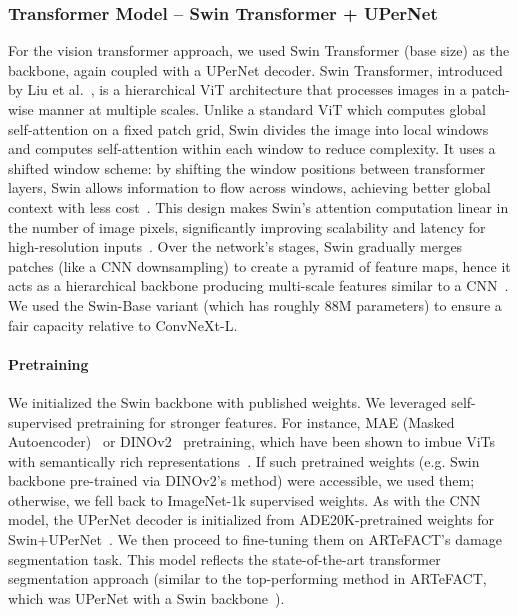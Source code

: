 \documentclass[conference]{IEEEtran}
\begin{document}
\subsubsection{Transformer Model – Swin Transformer + UPerNet}
For the vision transformer approach, we used Swin Transformer (base size) as the backbone, again coupled with a UPerNet decoder. Swin Transformer, introduced by Liu et al.~\cite{liu_swin_2021}, is a hierarchical ViT architecture that processes images in a patch-wise manner at multiple scales. Unlike a standard ViT which computes global self-attention on a fixed patch grid, Swin divides the image into local windows and computes self-attention within each window to reduce complexity. It uses a shifted window scheme: by shifting the window positions between transformer layers, Swin allows information to flow across windows, achieving better global context with less cost~\cite{liu_swin_2021}. This design makes Swin’s attention computation linear in the number of image pixels, significantly improving scalability and latency for high-resolution inputs~\cite{liu_swin_2021}. Over the network’s stages, Swin gradually merges patches (like a CNN downsampling) to create a pyramid of feature maps, hence it acts as a hierarchical backbone producing multi-scale features similar to a CNN~\cite{liu_swin_2021}. We used the Swin-Base variant (which has roughly 88M parameters) to ensure a fair capacity relative to ConvNeXt-L.
\paragraph{Pretraining}
We initialized the Swin backbone with published weights. We leveraged self-supervised pretraining for stronger features. For instance, MAE (Masked Autoencoder)~\cite{arslan_masked_2025} or DINOv2~\cite{oquab_dinov2_2024} pretraining, which have been shown to imbue ViTs with semantically rich representations~\cite{ivanova_artefact_2024}. If such pretrained weights (e.g. Swin backbone pre-trained via DINOv2’s method) were accessible, we used them; otherwise, we fell back to ImageNet-1k supervised weights. As with the CNN model, the UPerNet decoder is initialized from ADE20K-pretrained weights for Swin+UPerNet~\cite{ivanova_artefact_2024}. We then proceed to fine-tuning them on ARTeFACT's damage segmentation task. This model reflects the state-of-the-art transformer segmentation approach (similar to the top-performing method in ARTeFACT, which was UPerNet with a Swin backbone~\cite{ivanova_artefact_2024}).
\end{document}
